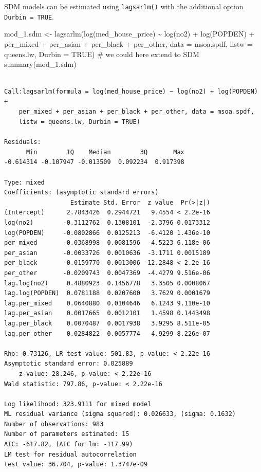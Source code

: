 \documentclass[
  letterpaper,
  DIV=11,
  numbers=noendperiod]{scrreprt}
\newenvironment{Shaded}{\begin{snugshade}}{\end{snugshade}}
\newcommand{\AttributeTok}[1]{\textcolor[rgb]{0.40,0.45,0.13}{#1}}
\newcommand{\CommentTok}[1]{\textcolor[rgb]{0.37,0.37,0.37}{#1}}
\newcommand{\ConstantTok}[1]{\textcolor[rgb]{0.56,0.35,0.01}{#1}}
\newcommand{\FunctionTok}[1]{\textcolor[rgb]{0.28,0.35,0.67}{#1}}
\newcommand{\NormalTok}[1]{\textcolor[rgb]{0.00,0.23,0.31}{#1}}
\newcommand{\OtherTok}[1]{\textcolor[rgb]{0.00,0.23,0.31}{#1}}
\newcommand{\SpecialCharTok}[1]{\textcolor[rgb]{0.37,0.37,0.37}{#1}}
\begin{document}
SDM models can be estimated using \texttt{lagsarlm()} with the
additional option \texttt{Durbin\ =\ TRUE}.

\begin{Shaded}
\begin{Highlighting}[]
\NormalTok{mod\_1.sdm }\OtherTok{\textless{}{-}} \FunctionTok{lagsarlm}\NormalTok{(}\FunctionTok{log}\NormalTok{(med\_house\_price) }\SpecialCharTok{\textasciitilde{}} \FunctionTok{log}\NormalTok{(no2) }\SpecialCharTok{+} \FunctionTok{log}\NormalTok{(POPDEN) }\SpecialCharTok{+} 
\NormalTok{                        per\_mixed }\SpecialCharTok{+}\NormalTok{ per\_asian }\SpecialCharTok{+}\NormalTok{ per\_black }\SpecialCharTok{+}\NormalTok{ per\_other,  }
                      \AttributeTok{data =}\NormalTok{ msoa.spdf, }
                      \AttributeTok{listw =}\NormalTok{ queens.lw,}
                      \AttributeTok{Durbin =} \ConstantTok{TRUE}\NormalTok{) }\CommentTok{\# we could here extend to SDM}
\FunctionTok{summary}\NormalTok{(mod\_1.sdm)}
\end{Highlighting}
\end{Shaded}

\begin{verbatim}

Call:lagsarlm(formula = log(med_house_price) ~ log(no2) + log(POPDEN) + 
    per_mixed + per_asian + per_black + per_other, data = msoa.spdf, 
    listw = queens.lw, Durbin = TRUE)

Residuals:
      Min        1Q    Median        3Q       Max 
-0.614314 -0.107947 -0.013509  0.092234  0.917398 

Type: mixed 
Coefficients: (asymptotic standard errors) 
                  Estimate Std. Error  z value  Pr(>|z|)
(Intercept)      2.7843426  0.2944721   9.4554 < 2.2e-16
log(no2)        -0.3112762  0.1308101  -2.3796 0.0173312
log(POPDEN)     -0.0802866  0.0125213  -6.4120 1.436e-10
per_mixed       -0.0368998  0.0081596  -4.5223 6.118e-06
per_asian       -0.0033726  0.0010636  -3.1711 0.0015189
per_black       -0.0159770  0.0013006 -12.2848 < 2.2e-16
per_other       -0.0209743  0.0047369  -4.4279 9.516e-06
lag.log(no2)     0.4880923  0.1456778   3.3505 0.0008067
lag.log(POPDEN)  0.0781188  0.0207600   3.7629 0.0001679
lag.per_mixed    0.0640880  0.0104646   6.1243 9.110e-10
lag.per_asian    0.0017665  0.0012101   1.4598 0.1443498
lag.per_black    0.0070487  0.0017938   3.9295 8.511e-05
lag.per_other    0.0284822  0.0057774   4.9299 8.226e-07

Rho: 0.73126, LR test value: 501.83, p-value: < 2.22e-16
Asymptotic standard error: 0.025889
    z-value: 28.246, p-value: < 2.22e-16
Wald statistic: 797.86, p-value: < 2.22e-16

Log likelihood: 323.9111 for mixed model
ML residual variance (sigma squared): 0.026633, (sigma: 0.1632)
Number of observations: 983 
Number of parameters estimated: 15 
AIC: -617.82, (AIC for lm: -117.99)
LM test for residual autocorrelation
test value: 36.704, p-value: 1.3747e-09
\end{verbatim}
\end{document}
